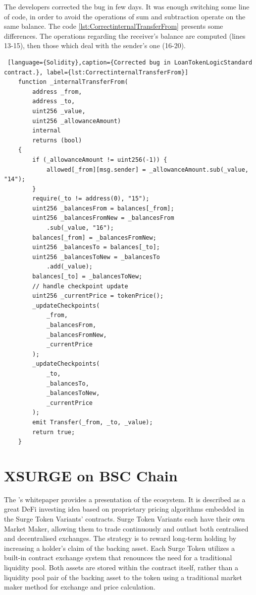 The developers corrected the bug in few days. 
It was enough switching some line of code, in order to avoid the operations of sum and subtraction operate on the same balance. 
The code \autoref{lst:CorrectinternalTransferFrom} presents some differences. The operations regarding the receiver's balance are computed (lines 13-15), then those which deal with the sender's one (16-20).
\begin{lstlisting} [language={Solidity},caption={Corrected bug in LoanTokenLogicStandard contract.}, label={lst:CorrectinternalTransferFrom}]
    function _internalTransferFrom(
        address _from,
        address _to,
        uint256 _value,
        uint256 _allowanceAmount)
        internal
        returns (bool)
    {
        if (_allowanceAmount != uint256(-1)) {
            allowed[_from][msg.sender] = _allowanceAmount.sub(_value, "14");
        }
        require(_to != address(0), "15");
        uint256 _balancesFrom = balances[_from];
        uint256 _balancesFromNew = _balancesFrom
            .sub(_value, "16");
        balances[_from] = _balancesFromNew;
        uint256 _balancesTo = balances[_to];
        uint256 _balancesToNew = _balancesTo
            .add(_value);
        balances[_to] = _balancesToNew;
        // handle checkpoint update
        uint256 _currentPrice = tokenPrice();
        _updateCheckpoints(
            _from,
            _balancesFrom,
            _balancesFromNew,
            _currentPrice
        );
        _updateCheckpoints(
            _to,
            _balancesTo,
            _balancesToNew,
            _currentPrice
        );
        emit Transfer(_from, _to, _value);
        return true;
    }   
\end{lstlisting}

\section{XSURGE on BSC Chain}   
\label{sec:Exploits:XSURGE}

The \citet{XSurgeWeb}'s whitepaper provides a presentation of the ecosystem.
It is described as a great DeFi investing idea based on proprietary pricing algorithms embedded in the Surge Token Variants' contracts.
Surge Token Variants each have their own Market Maker, allowing them to trade continuously and outlast both 
centralised and decentralised exchanges. 
The strategy is to reward long-term holding by increasing a
holder's claim of the backing asset. Each Surge Token utilizes a built-in contract exchange system that renounces the need for
a traditional liquidity pool. Both assets are stored within the contract itself, 
rather than a liquidity pool pair of the backing asset to the
token using a traditional market maker method for exchange and price calculation.


